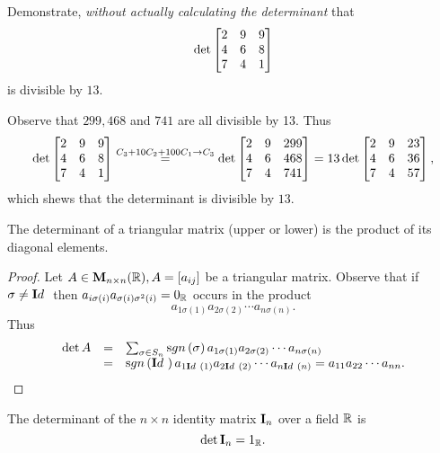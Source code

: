 \begin{exa}
Demonstrate, {\em without actually calculating the determinant}
that $$\det\begin{bmatrix}2 & 9 & 9 \cr 4 & 6 & 8 \cr 7 & 4 & 1
\cr
\end{bmatrix}$$is divisible by $13$.
\end{exa}
\begin{solu}Observe that $299, 468$ and $741$ are all divisible by
13. Thus $$\det\begin{bmatrix}2 & 9 & 9 \cr 4 & 6 & 8 \cr 7 & 4 &
1 \cr \end{bmatrix} \stackrel{C_3 + 10C_2 + 100C_1 \rightarrow
C_3}{ = }\det\begin{bmatrix}2 & 9 & 299 \cr 4 & 6 & 468 \cr 7 & 4
& 741 \cr \end{bmatrix} = 13\det\begin{bmatrix}2 & 9 & 23 \cr 4 &
6 & 36 \cr 7 & 4 & 57 \cr \end{bmatrix},$$which shews that the
determinant is divisible by $13$.
\end{solu}

 \begin{thm}
The determinant of a triangular matrix (upper or lower) is the
product of its diagonal elements.
 \end{thm}
 \begin{proof}
Let $A\in{\mathbf M}_{n\times n}( \mathbb{R}), A = [a_{ij}]$ be a triangular
matrix. Observe that if $\sigma \neq {\mathbf Id\ }$ then $a_{i\sigma
(i)}a_{\sigma(i)\sigma^2(i)} = 0_{\mathbb{R}}$ occurs in the product
$$a_{1\sigma (1)}a_{2\sigma (2)}
\cdots a_{n\sigma (n)}.  $$Thus $$\begin{array}{lll}\det A & = &
\sum _{\sigma \in S_n}\sgn{\sigma}a_{1\sigma (1)}a_{2\sigma
(2)}\cdots a_{n\sigma (n)}\\ &  = &  \sgn{\idefun}a_{1\idefun
(1)}a_{2\idefun (2)}\cdots a_{n\idefun (n)} = a_{11}a_{22} \cdots
a_{nn}. \end{array}
$$
 \end{proof}
 \begin{exa}
The determinant of the $n\times n$ identity matrix ${\textbf  I}_n$ over
a field $\mathbb{R}$ is $$\det  {\textbf  I}_n = 1_{\mathbb{R}}. $$
 \end{exa}

